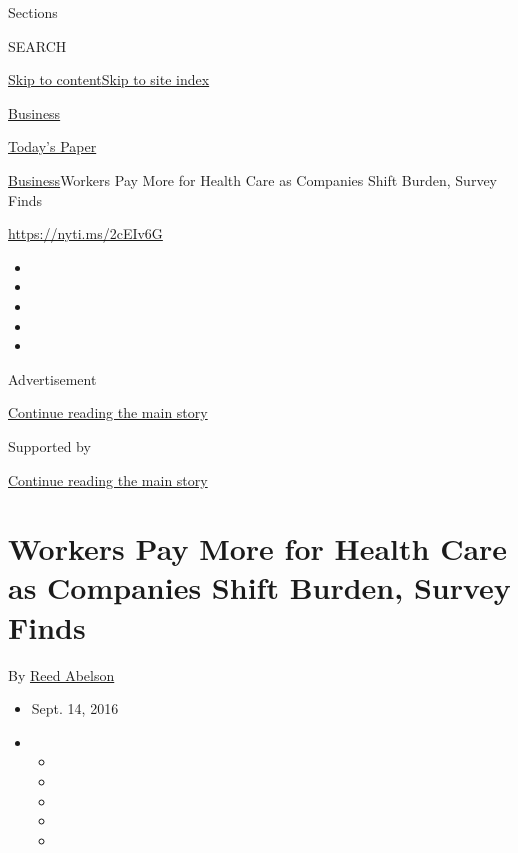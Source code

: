 Sections

SEARCH

\protect\hyperlink{site-content}{Skip to
content}\protect\hyperlink{site-index}{Skip to site index}

\href{https://www.nytimes3xbfgragh.onion/section/business}{Business}

\href{https://myaccount.nytimes3xbfgragh.onion/auth/login?response_type=cookie\&client_id=vi}{}

\href{https://www.nytimes3xbfgragh.onion/section/todayspaper}{Today's
Paper}

\href{/section/business}{Business}\textbar{}Workers Pay More for Health
Care as Companies Shift Burden, Survey Finds

\url{https://nyti.ms/2cEIv6G}

\begin{itemize}
\item
\item
\item
\item
\item
\end{itemize}

Advertisement

\protect\hyperlink{after-top}{Continue reading the main story}

Supported by

\protect\hyperlink{after-sponsor}{Continue reading the main story}

\hypertarget{workers-pay-more-for-health-care-as-companies-shift-burden-survey-finds}{%
\section{Workers Pay More for Health Care as Companies Shift Burden,
Survey
Finds}\label{workers-pay-more-for-health-care-as-companies-shift-burden-survey-finds}}

By \href{http://www.nytimes3xbfgragh.onion/by/reed-abelson}{Reed
Abelson}

\begin{itemize}
\item
  Sept. 14, 2016
\item
  \begin{itemize}
  \item
  \item
  \item
  \item
  \item
  \end{itemize}
\end{itemize}

